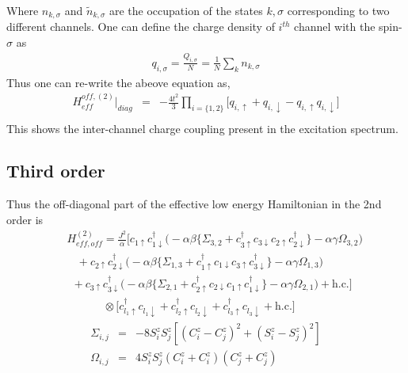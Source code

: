 \documentclass[reprint,prb,superscriptaddress]{revtex4-1}
\begin{document}
\noindent Where $n_{k,\sigma}$ and $\tilde{n}_{k,\sigma}$ are the occupation of the states $k,\sigma$ corresponding to two different channels. One can define the charge density of $i^{th}$ channel with the spin-$\sigma$ as 
\begin{eqnarray}
q_{i,\sigma}=\frac{Q_{i,\sigma}}{N}=\frac{1}{N}  \displaystyle\sum_{k} n_{k,\sigma}
\end{eqnarray}
Thus one can re-write the abeove equation as,
\begin{eqnarray}
H_{eff}^{off,(2)} \bigg|_{diag} &=& -\frac{4t^2}{3} \prod_{i=\{1,2\}} \bigg[q_{i,\uparrow}+q_{i,\downarrow}-q_{i,\uparrow}q_{i,\downarrow}\bigg] \nonumber\\
\end{eqnarray}
This shows the inter-channel charge coupling present in the excitation spectrum.


\subsection{Third order}


\noindent Thus the off-diagonal part of the effective low energy Hamiltonian in the 2nd order is
\begin{eqnarray}
&&H_{eff, off}^{(2)} 
= \frac{J^2}{\alpha}\bigg[ c_{1\uparrow}c_{1\downarrow}^{\dagger} \bigg(-\alpha\beta \bigg\{\Sigma_{3,2} + c_{3\uparrow}^{\dagger} c_{3\downarrow} c_{2\uparrow} c_{2\downarrow}^{\dagger} \bigg\}-\alpha\gamma \Omega_{3,2}\bigg) \nonumber\\
&&~~~~+c_{2\uparrow}c_{2\downarrow}^{\dagger} \bigg(-\alpha\beta \bigg\{\Sigma_{1,3} + c_{1\uparrow}^{\dagger} c_{1\downarrow} c_{3\uparrow} c_{3\downarrow}^{\dagger} \bigg\}-\alpha\gamma \Omega_{1,3}\bigg) \nonumber\\
&&~~+c_{3\uparrow}c_{3\downarrow}^{\dagger} \bigg(-\alpha\beta \bigg\{\Sigma_{2,1} + c_{2\uparrow}^{\dagger} c_{2\downarrow} c_{1\uparrow} c_{1\downarrow}^{\dagger} \bigg\}-\alpha\gamma \Omega_{2,1}\bigg) + \textrm{h.c.} \bigg]
\nonumber\\
&&~~~~~~~~~~~~~~~\otimes \bigg[ c_{l_1\uparrow}^{\dagger} c_{l_1\downarrow} +c_{l_2\uparrow}^{\dagger} c_{l_2\downarrow} + c_{l_3\uparrow}^{\dagger} c_{l_3\downarrow} + \textrm{h.c.}\bigg] \nonumber
\end{eqnarray} 
 \begin{eqnarray}
\Sigma_{i,j} &=&-8S_i^zS_j^z  [  (C^z_i-C^z_j  )^2  + (S_i^z-S_j^z  )^2  ] \\
\Omega_{i,j} &=& 4S_i^z S_j^z (C_i^z+C_i^z)(C_j^z+C_j^z)
\end{eqnarray}
\end{document}

